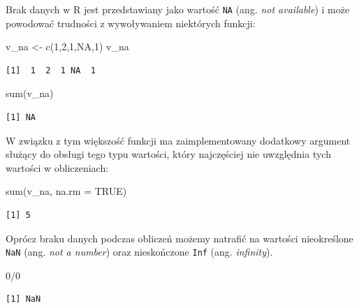 \documentclass[
  letterpaper,
  DIV=11,
  numbers=noendperiod]{scrreprt}
\newenvironment{Shaded}{\begin{snugshade}}{\end{snugshade}}
\newcommand{\AttributeTok}[1]{\textcolor[rgb]{0.40,0.45,0.13}{#1}}
\newcommand{\ConstantTok}[1]{\textcolor[rgb]{0.56,0.35,0.01}{#1}}
\newcommand{\DecValTok}[1]{\textcolor[rgb]{0.68,0.00,0.00}{#1}}
\newcommand{\FunctionTok}[1]{\textcolor[rgb]{0.28,0.35,0.67}{#1}}
\newcommand{\NormalTok}[1]{\textcolor[rgb]{0.00,0.23,0.31}{#1}}
\newcommand{\OtherTok}[1]{\textcolor[rgb]{0.00,0.23,0.31}{#1}}
\newcommand{\SpecialCharTok}[1]{\textcolor[rgb]{0.37,0.37,0.37}{#1}}
\begin{document}
Brak danych w R jest przedstawiany jako wartość \texttt{NA} (ang.
\emph{not available}) i może powodować trudności z wywoływaniem
niektórych funkcji:

\begin{Shaded}
\begin{Highlighting}[]
\NormalTok{v\_na }\OtherTok{\textless{}{-}} \FunctionTok{c}\NormalTok{(}\DecValTok{1}\NormalTok{,}\DecValTok{2}\NormalTok{,}\DecValTok{1}\NormalTok{,}\ConstantTok{NA}\NormalTok{,}\DecValTok{1}\NormalTok{)}
\NormalTok{v\_na}
\end{Highlighting}
\end{Shaded}

\begin{verbatim}
[1]  1  2  1 NA  1
\end{verbatim}

\begin{Shaded}
\begin{Highlighting}[]
\FunctionTok{sum}\NormalTok{(v\_na)}
\end{Highlighting}
\end{Shaded}

\begin{verbatim}
[1] NA
\end{verbatim}

W związku z tym większość funkcji ma zaimplementowany dodatkowy argument
służący do obsługi tego typu wartości, który najczęściej nie uwzględnia
tych wartości w obliczeniach:

\begin{Shaded}
\begin{Highlighting}[]
\FunctionTok{sum}\NormalTok{(v\_na, }\AttributeTok{na.rm =} \ConstantTok{TRUE}\NormalTok{)}
\end{Highlighting}
\end{Shaded}

\begin{verbatim}
[1] 5
\end{verbatim}

Oprócz braku danych podczas obliczeń możemy natrafić na wartości
nieokreślone \texttt{NaN} (ang. \emph{not a number}) oraz nieskończone
\texttt{Inf} (ang. \emph{infinity}).

\begin{Shaded}
\begin{Highlighting}[]
\DecValTok{0}\SpecialCharTok{/}\DecValTok{0}
\end{Highlighting}
\end{Shaded}

\begin{verbatim}
[1] NaN
\end{verbatim}
\end{document}
